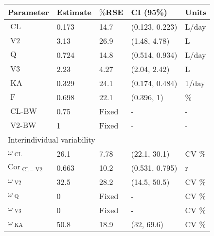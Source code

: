 \documentclass[varwidth, border={10 5 50 5}]{standalone}
\begin{document}
\begin{tabular}{l|l|l|l|l}
  \hline \hline
 Parameter & Estimate & $\%$RSE & CI (95\%) & Units \\ \hline
 $\text{ CL}$                           & 0.173            & 14.7\           & (0.123, 0.223)                       & L/day            \\
 $\text{ V2}$                           & 3.13             & 26.9\           & (1.48, 4.78)                         & L                \\
 $\text{ Q}$                            & 0.724            & 14.8\           & (0.514, 0.934)                       & L/day            \\
 $\text{ V3}$                           & 2.23             & 4.27\           & (2.04, 2.42)                         & L                \\
 $\text{ KA}$                           & 0.329            & 24.1\           & (0.174, 0.484)                       & 1/day            \\
 $\text{ F}$                            & 0.698            & 22.1\           & (0.396, 1)                           & \%              \\
 $\text{  CL-BW}$                       & 0.75             & Fixed            & -                                    & -                \\
 $\text{  V2-BW}$                       & 1                & Fixed            & -                                    & -                \\ \hline
\multicolumn{5}{l}{Interindividual variability} \\ \hline
 $\omega_{\text{ CL}}$                 & 26.1             & 7.78\           & (22.1, 30.1)                         & CV \%           \\
 $\text{Cor}_{\text{ CL}-\text{ V2}}$ & 0.663            & 10.2\           & (0.531, 0.795)                       & r                \\
 $\omega_{\text{ V2}}$                 & 32.5             & 28.2\           & (14.5, 50.5)                         & CV \%           \\
 $\omega_{\text{ Q}}$                  & 0                & Fixed            & -                                    & CV \%           \\
 $\omega_{\text{ V3}}$                 & 0                & Fixed            & -                                    & CV \%           \\
 $\omega_{\text{ KA}}$                 & 50.8             & 18.9\           & (32, 69.6)                           & CV \%           \\

\end{tabular}
\end{document}
